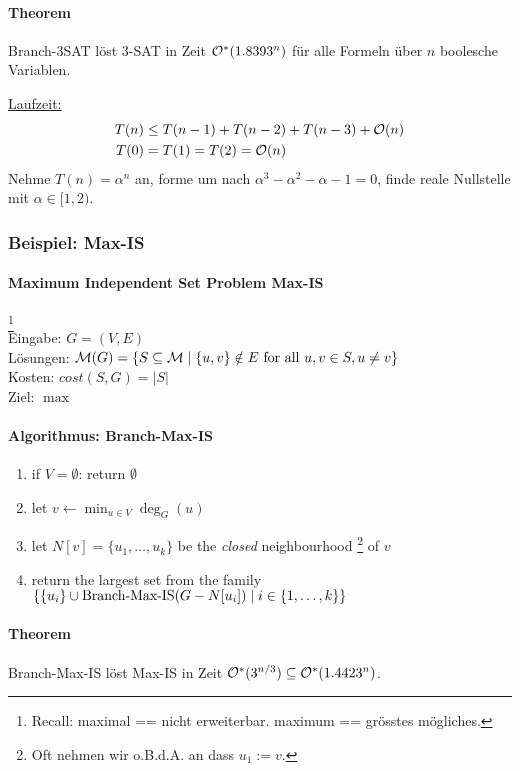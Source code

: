 \paragraph{Theorem}
Branch-3SAT löst 3-SAT in Zeit $\mathcal{O}^* (1.8393^n)$ für alle Formeln über $n$ boolesche Variablen.

\underline{Laufzeit:}
\begin{align*}
T(n) &\leq T(n-1) + T(n-2) + T(n-3) + \mathcal{O}(n) \\
T(0) &= T(1) = T(2) = \mathcal{O}(n)
\end{align*}
Nehme $T(n) = \alpha^n$ an, forme um nach $\alpha^3 - \alpha^2 - \alpha - 1 = 0$,
finde reale Nullstelle mit $\alpha \in [1,2)$.


\subsubsection{Beispiel: Max-IS}

\paragraph{Maximum Independent Set Problem Max-IS}
\footnote{Recall: maximal == nicht erweiterbar. maximum == grösstes mögliches.} \\
Eingabe: $G=(V,E)$ \\
Lösungen: $\mathcal{M}(G) = \{ S \subseteq \mathcal{M} \; | \; \{ u,v \} \notin E \text{ for all } u,v \in S, u \neq v \}$ \\
Kosten: $cost(S, G) = |S|$ \\
Ziel: $\max$

\paragraph{Algorithmus: Branch-Max-IS}
\begin{enumerate}
    \item if $V = \emptyset$: return $\emptyset$
    \item let $v \leftarrow \min_{u \in V} \deg_G(u)$
    \item let $N[v] = \{ u_1, \dots, u_k \}$ be the \emph{closed} neighbourhood%
    \footnote{Oft nehmen wir o.B.d.A. an dass $u_1 := v$.} of $v$
    \item return the largest set from the family $\{ \{u_i\} \cup \text{Branch-Max-IS}(G-N[u_i]) \; | \; i \in \{1,\dots,k\} \}$
\end{enumerate}

\paragraph{Theorem}
Branch-Max-IS löst Max-IS in Zeit $\mathcal{O}^* (3^{n/3})  \subseteq \mathcal{O}^* (1.4423^n)$.

